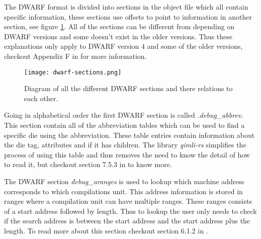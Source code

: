  


The \gls{DWARF} format is divided into sections in the object file which all contain specific information, these sections use offsets to point to information in another section, see figure \ref{fig:dwarfsections}.
All of the sections can be different from depending on \gls{DWARF} versions and some doesn't exist in the older versions.
Thus these explanations only apply to \gls{DWARF} version $4$ and some of the older versions, checkout Appendix F in \cite{dwarf} for more information.


\begin{figure}[h]
	\centering
	\texttt{[image: dwarf-sections.png]}
	\caption{Diagram of all the different \gls{DWARF} sections and there relations to each other.}
	\label{fig:dwarfsections}
\end{figure}


Going in alphabetical order the first \gls{DWARF} section is called \emph{.debug\_abbrev}.
This section contain all of the abbreviation tables which can be used to find a specific die using the abbreviation.
These table entries contain information about the die tag, attributes and if it has children.
The library \emph{gimli-rs} simplifies the process of using this table and thus removes the need to know the detail of how to read it, but checkout section 7.5.3 in \cite{dwarf} to know more.


The \gls{DWARF} section \emph{\.debug\_aranges} is used to lookup which machine address corresponds to which compilations unit.
This address information is stored in ranges where a compilation unit can have multiple ranges.
These ranges consists of a start address followed by length.
Thus to lookup the user only needs to check if the search address is between the start address and the start address plus the length.
To read more about this section checkout section 6.1.2 in \cite{dwarf}.


